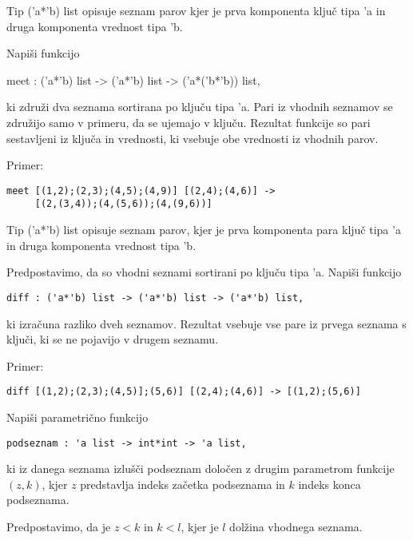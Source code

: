 \begin{ex}
Tip ('a*'b) list opisuje seznam parov kjer je prva komponenta klju\v c tipa 'a in druga komponenta vrednost tipa 'b. 

Napi\v si funkcijo 

meet : ('a*'b) list -> ('a*'b) list -> ('a*('b*'b)) list,

ki zdru\v zi dva seznama sortirana po klju\v cu tipa 'a. Pari iz vhodnih seznamov se zdru\v zijo samo v primeru, da se ujemajo v klju\v cu. Rezultat funkcije so pari sestavljeni iz klju\v ca in vrednosti, ki vsebuje obe vrednosti iz vhodnih parov.  

Primer:    
\begin{lstlisting}
meet [(1,2);(2,3);(4,5);(4,9)] [(2,4);(4,6)] -> 
     [(2,(3,4));(4,(5,6));(4,(9,6))]
\end{lstlisting}
\end{ex} 



\begin{ex}
  Tip ('a*'b) list opisuje seznam parov, kjer je prva komponenta para
  klju\v c tipa 'a in druga komponenta vrednost tipa 'b.

  Predpostavimo, da so vhodni seznami sortirani po klju\v cu tipa
  'a. Napi\v si funkcijo

\begin{lstlisting}
diff : ('a*'b) list -> ('a*'b) list -> ('a*'b) list,
\end{lstlisting}

  ki izra\v cuna razliko dveh seznamov. Rezultat vsebuje vse pare iz
  prvega seznama s klju\v ci, ki se ne pojavijo v drugem seznamu.

\noindent\/Primer:    
\begin{lstlisting}
diff [(1,2);(2,3);(4,5)];(5,6)] [(2,4);(4,6)] -> [(1,2);(5,6)]
\end{lstlisting}



\end{ex} 
\begin{ex}
Napi\v si parametri\v cno funkcijo 
\begin{lstlisting}
podseznam : 'a list -> int*int -> 'a list, 
\end{lstlisting}
ki iz danega seznama izlu\v s\v ci podseznam dolo\v cen z drugim parametrom funkcije $(z,k)$, 
kjer $z$ predstavlja indeks za\v cetka podseznama in $k$ indeks konca podseznama. 

Predpostavimo, da je $z<k$ in $k<l$, kjer je $l$ dol\v zina vhodnega seznama. 
\end{ex} 



